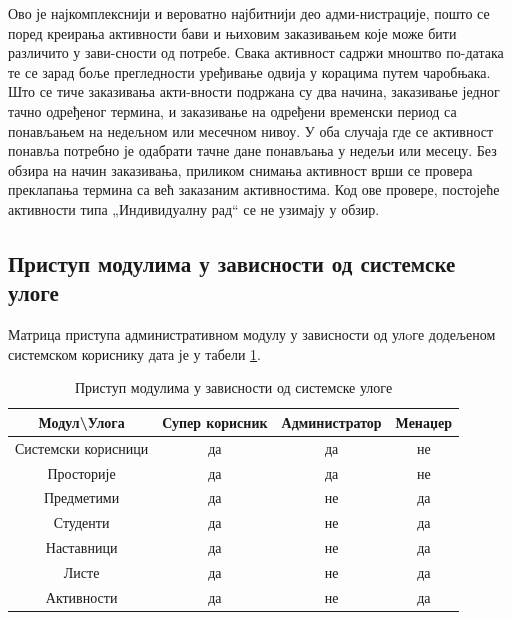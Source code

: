\documentclass[a4paper, 12pt, diplomski]{etfcyr}
\makeatletter
\gdef\tshortstack{\@ifnextchar[\@tshortstack{\@tshortstack[c]}}
\let\@tshortstack\@shortstack
\def\quote#1{„#1“}
\makeatother
\begin{document}
\begin{justify}
\begin{labeling}{\smash{\tshortstack[l]{Управљање\\активностима}}}
						\item[\smash{\tshortstack[l]{Управљање\\активностима}}]
							\begin{justify}
								Ово је најкомплекснији и вероватно најбитнији део адми-нистрације, пошто се поред креирања активности бави и њиховим заказивањем које може бити различито у зави-сности од потребе. Свака активност садржи мноштво по-датака те се зарад боље прегледности уређивање одвија у корацима путем чаробњака. Што се тиче заказивања акти-вности подржана су два начина, заказивање једног тачно одређеног термина, и заказивање на одређени временски период са понављањем на недељном или месечном нивоу. У оба случаја где се активност понавља потребно је одабрати тачне дане понављања у недељи или месецу. Без обзира на начин заказивања, приликом снимања активност врши се провера преклапања термина са већ заказаним активностима. Код ове провере, постојеће активности типа \quote{Индивидуалну рад} се не узимају у обзир.
							\end{justify}

						\end{labeling}
				\end{justify}

			\newpage

			\subsection{Приступ модулима у зависности од системске улоге}
				\begin{justify}
					Матрица приступа административном модулу у зависности од улoге додељеном системском кориснику дата је у табели \ref{table:1}.
				\end{justify}
				\begin{table}[H]
					\centering
					\begin{tabular}{ c||c|c|c }
						Модул\textbackslash Улога & Супер корисник & Администратор & Менаџер \\
						\hline\hline
						Системски корисници & да & да & не \\
						Просторије & да & да & не \\
						Предметими & да & не & да \\
						Студенти & да & не & да \\
						Наставници & да & не & да \\
						Листе & да & не & да \\
						Активности & да & не & да \\
						\hline
					\end{tabular}
					\caption{Приступ модулима у зависности од системске улоге}
					\label{table:1}
				\end{table}
\end{document}
